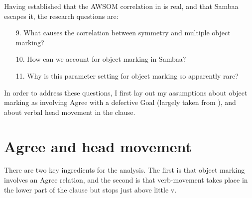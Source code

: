 \documentclass[output=paper
,modfonts
,nonflat]{langsci/langscibook}
\begin{document}

Having established that the AWSOM correlation in  is real, and that Sambaa escapes it, the research questions are:
\begin{enumerate}
\item [9.]What causes the correlation between symmetry and multiple object marking?
\item [10.]How can we account for object marking in Sambaa?
\item [11.]Why is this parameter setting for object marking so apparently rare?
\end{enumerate}
In order to address these questions, I first lay out my assumptions about object marking as involving Agree with a defective Goal (largely taken from \citealt{Van_der_Wal2015}), and about verbal head movement in the clause.

\section{Agree and head movement}

There are two key ingredients for the analysis. The first is that object marking involves an Agree relation, and the second is that verb-movement takes place in the lower part of the clause but stops just above little v.
\end{document}

